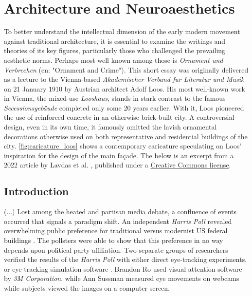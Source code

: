 \documentclass[a4paper]{article}
\begin{document}
\clearpage
\section{Architecture and Neuroaesthetics}

\begin{mdframed}[linewidth=1pt, roundcorner=5pt, innerleftmargin=10pt, innerrightmargin=10pt, innertopmargin=10pt, innerbottommargin=10pt, linecolor=black, backgroundcolor=white, userdefinedwidth=\textwidth]
    To better understand the intellectual dimension of the early modern movement against traditional architecture, it is essential to examine the writings and theories of its key figures, particularly those who challenged the prevailing aesthetic norms. Perhaps most well known among those is \textit{Ornament und Verbrechen} \cite{loos_ornament_1908} (en: "Ornament and Crime"). This short essay was originally delivered as a lecture to the Vienna-based \textit{Akademischer Verband fur Literatur und Musik} on 21 January 1910 by Austrian architect Adolf Loos. His most well-known work in Vienna, the mixed-use \textit{Looshaus}, stands in stark contrast to the famous \textit{Secessionsgebäude} completed only some 20 years earlier. With it, Loos pioneered the use of reinforced concrete in an otherwise brick-built city. A controversial design, even in its own time, it famously omitted the lavish ornamental decorations otherwise used on both representative and residential buildings of the city. \cref{fig:caricature_loos} shows a contemporary caricature speculating on Loos' inspiration for the design of the main façade. The below is an excerpt from a 2022 article by Lavdas et al. \cite{lavdas_architectural_2022}, published under a \href{https://creativecommons.org/licenses/by/4.0/}{Creative Commons license}.
\end{mdframed}

\subsection{Introduction}

(...) Lost among the heated and partisan media debate, a confluence of events occurred that signals a paradigm shift. An independent \textit{Harris Poll} revealed overwhelming public preference for traditional versus modernist US federal buildings \cite{noauthor_americans_2020}. The pollsters were able to show that this preference in no way depends upon political party affiliation. Two separate groups of researchers verified the results of the \textit{Harris Poll} with either direct eye-tracking experiments, or eye-tracking simulation software \cite{huffman_modern_2022}\cite{design_study-1_2022}. Brandon Ro used visual attention software by \textit{3M Corporation}, while Ann Sussman measured eye movements on webcams while subjects viewed the images on a computer screen.
\end{document}
